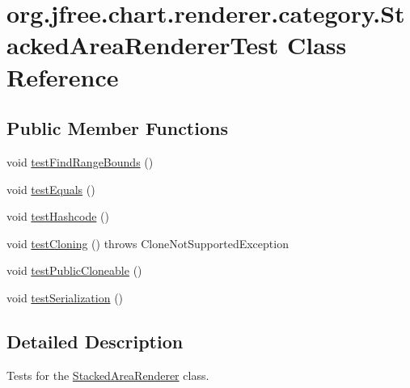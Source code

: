 \hypertarget{classorg_1_1jfree_1_1chart_1_1renderer_1_1category_1_1_stacked_area_renderer_test}{}\section{org.\+jfree.\+chart.\+renderer.\+category.\+Stacked\+Area\+Renderer\+Test Class Reference}
\label{classorg_1_1jfree_1_1chart_1_1renderer_1_1category_1_1_stacked_area_renderer_test}
\subsection*{Public Member Functions}
\begin{DoxyCompactItemize}
\item 
void \mbox{\hyperlink{classorg_1_1jfree_1_1chart_1_1renderer_1_1category_1_1_stacked_area_renderer_test_a7fd40a5e1c5ffbd0b94351276e2d03cb}{test\+Find\+Range\+Bounds}} ()
\item 
void \mbox{\hyperlink{classorg_1_1jfree_1_1chart_1_1renderer_1_1category_1_1_stacked_area_renderer_test_a55475006292640caf117c09cec3d7218}{test\+Equals}} ()
\item 
void \mbox{\hyperlink{classorg_1_1jfree_1_1chart_1_1renderer_1_1category_1_1_stacked_area_renderer_test_a4ac50d49a1428ab009919e23bccf87c1}{test\+Hashcode}} ()
\item 
void \mbox{\hyperlink{classorg_1_1jfree_1_1chart_1_1renderer_1_1category_1_1_stacked_area_renderer_test_ae7003de85bb42e2e0477ed51b9d16da1}{test\+Cloning}} ()  throws Clone\+Not\+Supported\+Exception 
\item 
void \mbox{\hyperlink{classorg_1_1jfree_1_1chart_1_1renderer_1_1category_1_1_stacked_area_renderer_test_ab83fa2961fad15de94620146361ab02d}{test\+Public\+Cloneable}} ()
\item 
void \mbox{\hyperlink{classorg_1_1jfree_1_1chart_1_1renderer_1_1category_1_1_stacked_area_renderer_test_a688ad0c396288595f068238230718ca8}{test\+Serialization}} ()
\end{DoxyCompactItemize}


\subsection{Detailed Description}
Tests for the \mbox{\hyperlink{classorg_1_1jfree_1_1chart_1_1renderer_1_1category_1_1_stacked_area_renderer}{Stacked\+Area\+Renderer}} class. 

